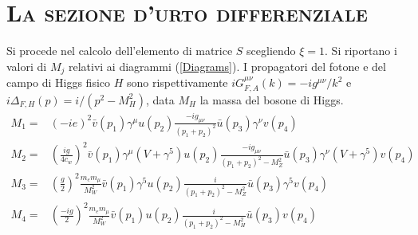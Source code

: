 \documentclass[11pt]{article}
\begin{document}
    \section{\centering\textsc{La sezione d'urto differenziale} } %
    Si procede nel calcolo dell'elemento di matrice $S$ scegliendo $\xi=1$. Si riportano i valori di $M_j$ relativi ai diagrammi (\ref{Diagrams}). I propagatori del fotone e del campo di Higgs fisico $H$ sono rispettivamente
    $iG_{F,A}^{\mu\nu}(k)=-ig^{\mu\nu}/k^2$ e $i\Delta_{F,H}(p)=i/(p^2-M_H^2)$, data $M_H$ la massa del bosone di Higgs.
    \begin{align}
    M_1=&\left(-ie\right)^2\bar{v}(p_1)\gamma^\mu u(p_2)\frac{-ig_{\mu\nu}}{(p_1+p_2)^2}\bar{u}(p_3)\gamma^\nu v(p_4)\label{M1}\\
    M_2=&\left(\frac{ig}{4c_w}\right)^2\bar{v}(p_1)\gamma^\mu(V+\gamma^5) u(p_2)\frac{-ig_{\mu\nu}}{(p_1+p_2)^2-M_Z^2}\bar{u}(p_3)\gamma^\nu(V+\gamma^5) v(p_4)\label{M2}\\
    M_3=&\left(\frac{g}{2}\right)^2\frac{m_em_\mu}{M_W^2}\bar{v}(p_1)\gamma^5u(p_2)\frac{i}{(p_1+p_2)^2-M_Z^2}\bar{u}(p_3)\gamma^5v(p_4)\label{M3}\\
    M_4=&\left(\frac{-ig}{2}\right)^2\frac{m_em_\mu}{M_W^2}\bar{v}(p_1)u(p_2)\frac{i}{(p_1+p_2)^2-M_H^2}\bar{u}(p_3)v(p_4)\label{M4}
    \end{align}
\end{document}
